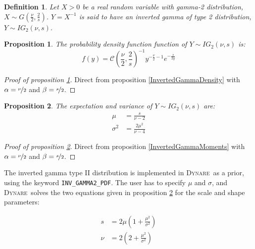 \documentclass{amsart}
\theoremstyle{plain}
\newtheorem{proposition}{Proposition}[section]
\newtheorem{definition}{Definition}[section]
\theoremstyle{remark}
\numberwithin{equation}{section}
\newcommand{\Dynare}{\textsc{Dynare}}
\begin{document}
\begin{definition}\label{InvertedGamma2}
  Let $X>0$ be a real random variable with gamma-2 distribution, $X\sim G\left(\frac{\nu}{2},\frac{2}{s}\right)$. $Y = X^{-1}$ is said to have an inverted gamma of type 2 distribution, $Y\sim IG_2(\nu, s)$. 
\end{definition}

\begin{proposition}\label{InvertedGamma2Density}
  The probability density function function of $Y\sim IG_2(\nu, s)$ is:
  \[
    f(y) = \mathcal C\left(\frac{\nu}{2}, \frac{2}{s}\right)^{-1}y^{-\frac{\nu}{2}-1}e^{-\frac{s}{2 y}}
  \]
\end{proposition}

\begin{proof}[Proof of proposition \ref{InvertedGamma2Density}]
  Direct from proposition \ref{InvertedGammaDensity} with $\alpha=\nicefrac{\nu}{2}$ and $\beta=\nicefrac{s}{2}$. 
\end{proof}

\begin{proposition}\label{InvertedGamma2Moments}
  The expectation and variance of $Y\sim IG_2(\nu, s)$ are:
  \[
    \begin{split}
      \mu &= \frac{s}{\nu-2}\\
      \sigma^2 &= \frac{2\mu^2}{\nu-4}
    \end{split}
  \]
\end{proposition}

\begin{proof}[Proof of proposition \ref{InvertedGamma2Moments}]
  Direct from proposition \ref{InvertedGammaMoments} with $\alpha=\nicefrac{\nu}{2}$ and $\beta=\nicefrac{s}{2}$. 
\end{proof}

The inverted gamma type II distribution is implemented in \Dynare\ as a prior, using the
keyword \verb+INV_GAMMA2_PDF+. The user has to specify $\mu$ and $\sigma$, and \Dynare\ solves the
two equations given in proposition \ref{InvertedGamma2Moments} for the scale and shape parameters:

\begin{equation}
  \begin{split}
    s &= 2\mu\left(1+\frac{\mu^2}{\sigma^2}\right)\\
    \nu &= 2\left(2+\frac{\mu^2}{\sigma^2}\right) 
  \end{split}
\end{equation}
\end{document}

